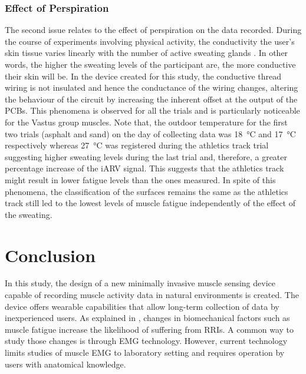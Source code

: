 \documentclass[letterpaper, 10 pt, conference]{ieeeconf}
\newcommand{\rg}[1]{{\scriptsize\color{blue}[RG: #1]}}
\renewcommand{\rg}[1]{}
\begin{document}
\subsubsection{Effect of Perspiration}
The second issue relates to the effect of perspiration on the data recorded.
During the course of experiments involving physical activity, the conductivity
the user's skin tissue varies linearly with the number of active sweating
glands \cite{thomas1957relationship}. In other words, the higher the sweating
levels of the participant are, the more conductive their skin will be. In the
device created for this study, the conductive thread wiring is not \rg{isolated} insulated
and hence the conductance of the wiring changes, altering the behaviour of the
circuit by increasing the inherent offset at the output of the PCBs. This
phenomena is observed for all the trials and is particularly noticeable for the
Vastus group muscles. Note that, the outdoor temperature for the first two trials (asphalt and sand)
on the day of collecting data was \SI{18}{\degreeCelsius} and
\SI{17}{\degreeCelsius} respectively whereas \SI{27}{\degreeCelsius} was
registered during the athletics track trial suggesting higher sweating levels
during the last trial and, therefore, a greater percentage increase of the iARV signal. This suggests that the athletics track might result in lower fatigue levels than the ones measured. In  spite of this phenomena, the classification of the surfaces remains the same as the athletics track still led to the lowest levels of muscle fatigue independently of the effect of the sweating.





\section{Conclusion}
In this study, the design of a new minimally invasive muscle sensing device
capable of recording muscle activity data in natural environments is
created. The device offers wearable capabilities that allow
long-term collection of data by inexperienced users. As explained in
, changes in biomechanical factors such as muscle fatigue
increase the likelihood of suffering from RRIs. A common way to study those
changes is through EMG technology. However, current technology limits studies of muscle EMG to laboratory setting and requires operation by users with anatomical knowledge. 
\end{document}

